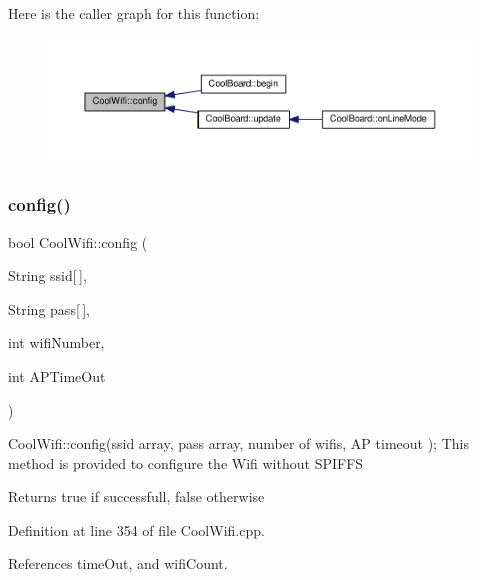 Here is the caller graph for this function\+:\nopagebreak
\begin{figure}[H]
\begin{center}
\leavevmode
\includegraphics[width=350pt]{classCoolWifi_a4eb2f6b9b09dd588964b88b6c70122c0_icgraph}
\end{center}
\end{figure}
\mbox{\label{classCoolWifi_a871d4a0d9978f17fdf6d874fc2958b6c}} 
\subsubsection{\texorpdfstring{config()}{config()}\hspace{0.1cm}{\footnotesize\ttfamily [2/2]}}
{\footnotesize\ttfamily bool Cool\+Wifi\+::config (\begin{DoxyParamCaption}\item[{String}]{ssid\mbox{[}$\,$\mbox{]},  }\item[{String}]{pass\mbox{[}$\,$\mbox{]},  }\item[{int}]{wifi\+Number,  }\item[{int}]{A\+P\+Time\+Out }\end{DoxyParamCaption})}

Cool\+Wifi\+::config(ssid array, pass array, number of wifis, A\+P timeout ); This method is provided to configure the Wifi without S\+P\+I\+F\+FS

\begin{DoxyReturn}{Returns}
true if successfull, false otherwise 
\end{DoxyReturn}


Definition at line 354 of file Cool\+Wifi.\+cpp.



References time\+Out, and wifi\+Count.


